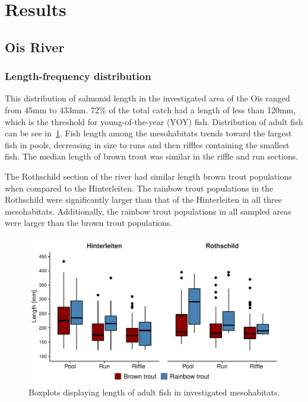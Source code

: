 \section{Results}

\subsection{Ois River}\label{sec:ois_river}       %




\subsubsection{Length-frequency distribution}\label{sec:ois_fish_lf}

This distribution of salmonid length in the investigated area of the Ois ranged from 45mm to 433mm.
72\% of the total catch had a length of less than 120mm, which is the threshold for young-of-the-year (YOY) fish.
Distribution of adult fish can be see in~\cref{fig:avg_length}.
Fish length among the mesohabitats trends toward the largest fish in pools, decreasing in size to runs and then riffles containing the smallest fish.
The median length of brown trout was similar in the riffle and run sections.

The Rothschild section of the river had similar length brown trout populations when compared to the Hinterleiten.
The rainbow trout populations in the Rothschild were significantly larger than that of the Hinterleiten in all three mesohabitats.
Additionally, the rainbow trout populations in all sampled areas were larger than the brown trout populations.

\begin{figure}[!htb]                              %
	\center
	\includegraphics[width=.7\textwidth]{images/avg_length.pdf}                %
	\caption{Boxplots displaying length of adult fish in investigated mesohabitats.}      %
	\label{fig:avg_length}                                                       %
\end{figure}


